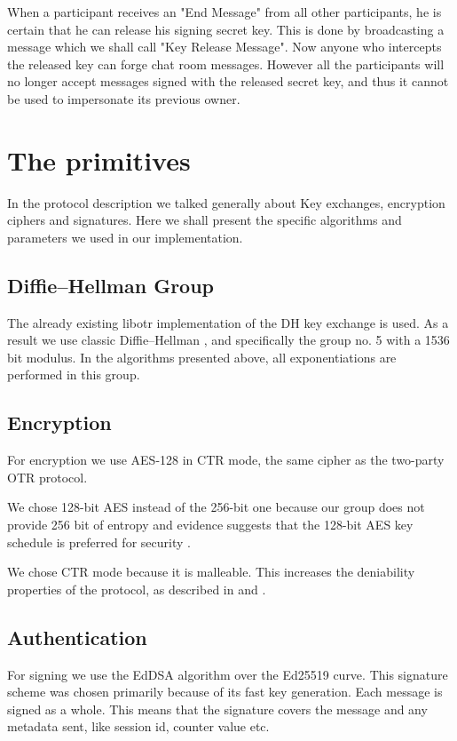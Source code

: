 When a participant receives an "End Message" from all other participants, he is certain that he can release his signing secret key. This is done by broadcasting a message which we shall call "Key Release Message". Now anyone who intercepts the released key can forge chat room messages. However all the participants will no longer accept messages signed with the released secret key, and thus it cannot be used to impersonate its previous owner.

\section{The primitives}
\label{setions:Protocol:primitives}
In the protocol description we talked generally about \dhname Key exchanges, encryption ciphers and signatures.
Here we shall present the specific algorithms and parameters we used in our implementation.

\subsection{Diffie--Hellman Group}
The already existing libotr implementation of the DH key exchange is used.
As a result we use classic Diffie--Hellman , and specifically the group no. 5 \cite{website:dh-rfc} with a 1536 bit modulus.
In the algorithms presented above, all exponentiations are performed in this group.

\subsection{Encryption}

For encryption we use AES-128 in CTR mode, the same cipher as the two-party OTR protocol.

We chose 128-bit AES instead of the 256-bit one because our \dhname group does not provide 256 bit of entropy and evidence suggests that the 128-bit AES key schedule is preferred for security \cite{aes-key-recov} \cite{rijndael-improved-analysis}.

We chose CTR mode because it is malleable.
This increases the deniability properties of the protocol, as described in \cite{otr} and \cite{otr_improvedauth}.

\subsection{Authentication}
For signing we use the EdDSA algorithm over the Ed25519 curve.
This signature scheme was chosen primarily because of its fast key generation.
Each message is signed as a whole.
This means that the signature covers the message and any metadata sent, like session id, counter value etc.

